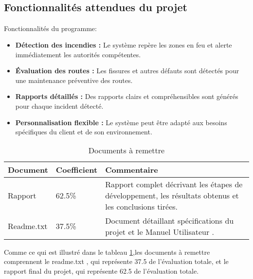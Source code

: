 \subsection{Fonctionnalités attendues du projet}
\label{sec:spec2}

\paragraph{} Fonctionnalités du programme:
\begin{itemize}
\item \textbf{Détection des incendies :} Le système repère les zones en feu et alerte immédiatement les autorités compétentes.
\item \textbf{Évaluation des routes :} Les fissures et autres défauts sont détectés pour une maintenance préventive des routes.
\item \textbf{Rapports détaillés :} Des rapports clairs et compréhensibles sont générés pour chaque incident détecté.
\item \textbf{Personnalisation flexible :} Le système peut être adapté aux besoins spécifiques du client et de son environnement.
\end{itemize}

\begin{table}[h!]
\centering
\begin{tabular} {|p{3.5cm}|p{2.5cm}|p{5cm}|}
\hline
Document & Coefficient & Commentaire \\

\hline
Rapport & 62.5\% & Rapport complet décrivant les étapes de développement, les résultats obtenus et les conclusions tirées. \\
\hline
Readme.txt & 37.5\% & Document détaillant spécifications du projet et le Manuel Utilisateur . \\
\hline
\end{tabular}
\caption{Documents à remettre}
\label{tab:document}
\end{table}

Comme ce qui est illustré dans le tableau \ref{tab:document},les documents à remettre comprennent le readme.txt , qui représente 37.5%
de l'évaluation totale, et le rapport final du projet, qui représente 62.5%
de l'évaluation totale.

